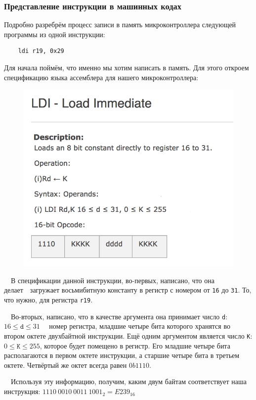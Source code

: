 \documentclass[aspectratio=169, pdf, 8pt, unicode]{beamer}
\begin{document}
\begin{frame}[fragile]
\frametitle{Представление инструкции в машинных кодах}
	Подробно разребрём процесс записи в память микроконтроллера следующей программы из одной инструкции:
	\begin{lstlisting}
	ldi r19, 0x29
	\end{lstlisting}
	{
		Для начала поймём, что именно мы хотим написать в память. Для этого откроем спецификацию
		языка ассемблера для нашего микроконтроллера:
	}

	\begin{minipage}{.40\textwidth}
		\begin{figure}[H]
		      \centering
		      \includegraphics[width=\textwidth]{resources/ldi.png}
		\end{figure}
	\end{minipage}
	\begin{minipage}{.55\textwidth}
		{
			\ \ В спецификации данной инструкции, во-первых, написано, что она делает\ \cyrdash\ загружает восьмибитную
			константу в регистр с номером от \texttt{16} до \texttt{31}. То, что нужно, для регистра \texttt{r19}.

			\ \ Во-вторых, написано, что в качестве аргумента она принимает число \texttt{d}: $16 \leq \texttt{d} \leq 31$
			\ \cyrdash\ номер регистра, младшие четыре бита которого хранятся во втором октете двухбайтной инструкции.
			Ещё одним аргументом является число \texttt{K}: $0 \leq \texttt{K} \leq 255$, которое будет помещено в регистр.
			Его младшие четыре бита располагаются в первом октете инструкции, а старшие четыре бита в третьем октете.
			Четвёртый же октет всегда равен $0b1110$.

			\ \ Используя эту информацию, получим, каким двум байтам соответствует наша инструкция:
			$1110\ 0010\ 0011\ 1001_{2} = E239_{16}$
		}
	\end{minipage}
\end{frame}
\end{document}
